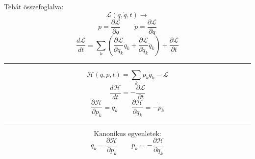 \documentclass[a4paper,12pt]{article}
\begin{document}
Tehát összefoglalva:
\begin{equation}
    \mathcal{L}(q, \dot{q}, t) \rightarrow
\end{equation}
\begin{equation}
    p = \frac{\partial \mathcal{L}}{\partial \dot{q}} \quad \quad \dot{p} = \frac{\partial \mathcal{L}}{\partial q}
\end{equation}
\begin{equation}
    \frac{d\mathcal{L}}{dt} = \sum_k \left( \frac{\partial \mathcal{L}}{\partial q_k} \dot{q}_k + \frac{\partial \mathcal{L}}{\partial \dot{q}_k} \ddot{q}_k \right) + \frac{\partial \mathcal{L}}{\partial t}
\end{equation}
\noindent\hfil\rule{0.5\textwidth}{.4pt}\hfil
\begin{equation}
    \mathcal{H}(q, p, t) = \sum_k p_k \dot{q}_k - \mathcal{L}
\end{equation}
\begin{equation}
    \frac{d\mathcal{H}}{dt} = - \frac{\partial \mathcal{L}}{\partial t}
\end{equation}
\begin{equation}
    \frac{\partial \mathcal{H}}{\partial p_k} = \dot{q}_k \quad \quad \frac{\partial \mathcal{H}}{\partial q_k} = -\dot{p}_k
\end{equation}
\noindent\hfil\rule{0.5\textwidth}{.4pt}\hfil
\begin{equation}
    \text{Kanonikus egyenletek:}
\end{equation}
\begin{equation}
    \dot{q}_k = \frac{\partial \mathcal{H}}{\partial p_k} \quad \quad \dot{p}_k = -\frac{\partial \mathcal{H}}{\partial q_k}
\end{equation}
\end{document}
